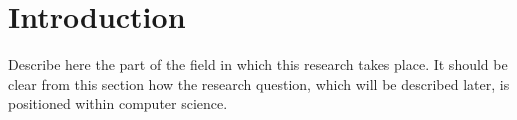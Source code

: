 \section{Introduction}
\label{sec:introduction}
 Describe here the part of the field in which this research takes place. It should be clear
from this section how the research question, which will be described later, is positioned within
computer science.